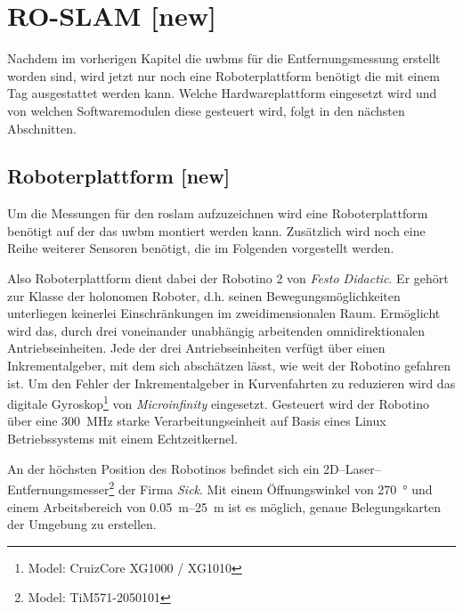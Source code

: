 \begin{comment}
------------------------------------------------------------------------------------------
\end{comment}
\chapter{RO-SLAM [new]}\label{ch:ro_slam}

Nachdem im vorherigen Kapitel die \Glspl{uwbm} für die Entfernungsmessung erstellt worden sind, wird jetzt nur noch eine Roboterplattform benötigt die mit einem Tag ausgestattet werden kann. Welche Hardwareplattform eingesetzt wird und von welchen Softwaremodulen diese gesteuert wird, folgt in den nächsten Abschnitten.

\begin{comment}
--------------------------------------------------------------------------------
- Einsatz mobiler Roboter in der Logistik am Beispiel des Robotino
	- http://www.r-moehrle.de/wissenschaftlicheArbeiten/robotino1.pdf
\end{comment}
\section{Roboterplattform [new]}

Um die Messungen für den \Gls{roslam} aufzuzeichnen wird eine Roboterplattform benötigt auf der das \Gls{uwbm} montiert werden kann. Zusätzlich wird noch eine Reihe weiterer Sensoren benötigt, die im Folgenden vorgestellt werden.

Also Roboterplattform dient dabei der Robotino 2 von \textit{Festo Didactic}. Er gehört zur Klasse der holonomen Roboter, d.h. seinen Bewegungsmöglichkeiten unterliegen keinerlei Einschränkungen im zweidimensionalen Raum. Ermöglicht wird das, durch drei voneinander unabhängig arbeitenden omnidirektionalen Antriebseinheiten. Jede der drei Antriebseinheiten verfügt über einen Inkrementalgeber, mit dem sich abschätzen lässt, wie weit der Robotino gefahren ist. Um den Fehler der Inkrementalgeber in Kurvenfahrten zu reduzieren wird das digitale Gyroskop\footnote{Model: CruizCore XG1000 / XG1010} von \textit{Microinfinity} eingesetzt. Gesteuert wird der Robotino über eine \SI{300}{\MHz} starke Verarbeitungseinheit auf Basis eines Linux Betriebssystems mit einem Echtzeitkernel. \cite{festo2007robotinomanual}

An der höchsten Position des Robotinos befindet sich ein 2D--Laser--Entfernungsmesser\footnote{Model: TiM571-2050101} der Firma \textit{Sick}. Mit einem Öffnungswinkel von \SI{270}{\degree} und einem Arbeitsbereich von \SIrange{0.05}{25}{\meter} ist es möglich, genaue Belegungskarten der Umgebung zu erstellen. \cite{sick2016operatingmanual}

